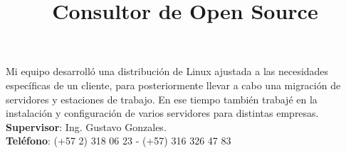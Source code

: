 \begin{resume}


\title{\textbf{Consultor de  Open Source}}
\begin{position}
Mi equipo desarroll\'{o} una distribuci\'{o}n de Linux ajustada a las
necesidades espec\'{i}ficas de un cliente, para posteriormente llevar
a cabo una  migraci\'{o}n de servidores y estaciones de trabajo. En ese tiempo tambi\'{e}n trabaj\'{e} en
la instalaci\'{o}n y configuraci\'{o}n de varios servidores para
distintas empresas.\\ 
\textbf{Supervisor}: Ing. Gustavo Gonzales.\\
\textbf{Tel\'{e}fono}:  (+57 2) 318 06 23 - (+57) 316 326 47 83
\end{position}
 \newline
 \newline
 \newline
 \newline
 \newline
                                   



\end{resume}
